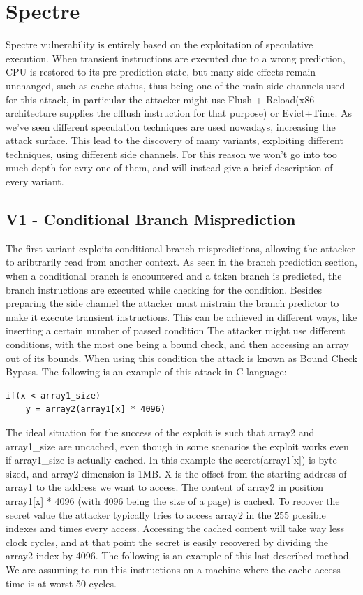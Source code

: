 \section{Spectre}
Spectre vulnerability is entirely based on the exploitation of speculative execution.
When transient instructions are executed due to a wrong prediction, CPU is restored to its pre-prediction state, but many side effects remain unchanged, such as cache status, thus being one of the main side channels used for this attack, in particular the attacker might use Flush + Reload(x86 architecture supplies the clflush instruction for that purpose) or Evict+Time.
As we've seen different speculation techniques are used nowadays, increasing the attack surface.
This lead to the discovery of many variants, exploiting different techniques, using different side channels.
For this reason we won't go into too much depth for evry one of them, and will instead give a brief description of every variant.

\subsection{V1 - Conditional Branch Misprediction}
The first variant exploits conditional branch mispredictions, allowing the attacker to aribtrarily read from another context. As seen in the branch prediction section, when a conditional branch is encountered and a taken branch is predicted, the branch instructions are executed while checking for the condition.
Besides preparing the side channel the attacker must mistrain the branch predictor to make it execute transient instructions.
This can be achieved in different ways, like inserting a certain number of passed condition 
The attacker might use different conditions, with the most one being a bound check, and then accessing an array out of its bounds. When using this condition the attack is known as Bound Check Bypass.
The following is an example of this attack in C language:

\begin{verbatim}
if(x < array1_size)
	y = array2(array1[x] * 4096)
\end{verbatim}

The ideal situation for the success of the exploit is such that array2 and array1\_size are uncached, even though in some scenarios the exploit works even if array1\_size is actually cached.
In this example the secret(array1[x]) is byte-sized, and array2 dimension is 1MB.
X is the offset from the starting address of array1 to the address we want to access.
The content of array2 in position array1[x] * 4096 (with 4096 being the size of a page) is cached.
To recover the secret value the attacker typically tries to access array2 in the 255 possible indexes and times every access.
Accessing the cached content will take way less clock cycles, and at that point the secret is easily recovered by dividing the array2 index by 4096.
The following is an example of this last described  method. We are assuming to run this instructions on a machine where the cache access time is at worst 50 cycles.

